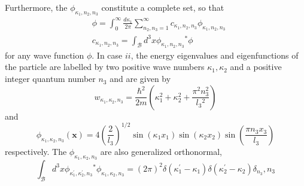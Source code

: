 \documentclass{article}
\begin{document}
Furthermore, the $\phi_{\kappa_{1}, n_{2}, n_{3}}$ constitute a complete set, so that
$$
\begin{align*}
& \phi=\int_{0}^{\infty} \frac{d \kappa_{1}}{2 \pi} \sum_{n_{2}, n_{3}=1}^{\infty} c_{\kappa_{1}, n_{2}, n_{3}} \phi_{\kappa_{1}, n_{2}, n_{3}}  \tag{3.15.57}\\
& c_{\kappa_{1}, n_{2}, n_{3}}=\int_{\mathcal{B}} d^{3} x \phi_{\kappa_{1}, n_{2}, n_{3}}{ }^{*} \phi \tag{3.15.58}
\end{align*}
$$
for any wave function $\phi$. In case $i i$, the energy eigenvalues and eigenfunctions of the particle are labelled by two positive wave numbers $\kappa_{1}, \kappa_{2}$ and a positive integer quantum number $n_{3}$ and are given by
$$
\begin{equation*}
w_{\kappa_{1}, \kappa_{2}, n_{3}}=\frac{\hbar^{2}}{2 m}\left(\kappa_{1}^{2}+\kappa_{2}^{2}+\frac{\pi^{2} n_{3}^{2}}{l_{3}{ }^{2}}\right) \tag{3.15.59}
\end{equation*}
$$
and
$$
\begin{equation*}
\phi_{\kappa_{1}, \kappa_{2}, n_{3}}(\boldsymbol{x})=4\left(\frac{2}{l_{3}}\right)^{1 / 2} \sin \left(\kappa_{1} x_{1}\right) \sin \left(\kappa_{2} x_{2}\right) \sin \left(\frac{\pi n_{3} x_{3}}{l_{3}}\right) \tag{3.15.60}
\end{equation*}
$$
respectively. The $\phi_{\kappa_{1}, \kappa_{2}, n_{3}}$ are also generalized orthonormal,
$$
\begin{equation*}
\int_{\mathcal{B}} d^{3} x \phi_{\kappa_{1}^{\prime}, \kappa_{2}^{\prime}, n_{3}}{ }^{*} \phi_{\kappa_{1}, \kappa_{2}, n_{3}}=(2 \pi)^{2} \delta\left(\kappa_{1}^{\prime}-\kappa_{1}\right) \delta\left(\kappa_{2}^{\prime}-\kappa_{2}\right) \delta_{n_{3}}, n_{3} \tag{3.15.61}
\end{equation*}
$$
\end{document}
